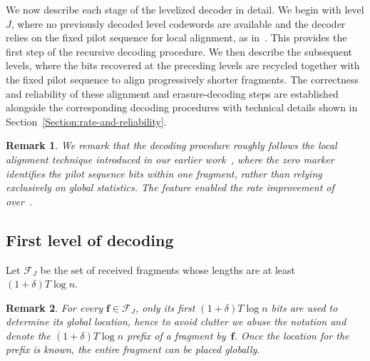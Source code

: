 \documentclass[journal,letterpaper,onecolumn,11pt]{IEEEtran}
\newcommand{\cF}{\mathcal{F}}
\newcommand{\boldf}{\mathbf{f}}
\newtheorem{remark}{Remark}
\begin{document}
We now describe each stage of the levelized decoder in detail. 
We begin with level \(J\), where no previously decoded level codewords are available and the decoder relies on the fixed pilot sequence for local
alignment, as in~\cite{liu2026improved}.  
This provides the first step of the recursive decoding
procedure. 
We then describe the subsequent levels, where the bits recovered
at the preceding levels are recycled together with the fixed pilot sequence to
align progressively shorter fragments.  
The correctness and reliability of these alignment and erasure-decoding steps are established alongside the corresponding decoding procedures with technical details shown in Section~\ref{Section:rate-and-reliability}.

\begin{remark}\label{remark:local alignment}
    We remark that the decoding procedure roughly follows the \emph{local alignment} technique introduced in our earlier work~\cite{liu2026improved}, where the zero marker identifies the pilot sequence bits within one fragment, rather than relying exclusively on global statistics. 
    The feature enabled the rate improvement of~\cite{liu2026improved} over~\cite{shomorony2021torn}.
\end{remark}


\subsection{First level of decoding}
\label{subsection:initial-pilot-decoding}
Let \(\cF_J\) be the set of received fragments whose lengths are at least \((1+\delta)T\log n\).
\begin{remark}\label{remark:prefix of fragment}
    For every \(\boldf\in\cF_J\), only its first \((1+\delta)T\log n\) bits are used to determine its global location, hence to avoid clutter we abuse the notation and denote the \((1+\delta)T\log n\) prefix of a fragment by~$\boldf$.
Once the location for the prefix is known, the entire fragment can be placed globally.
\end{remark}
\end{document}
